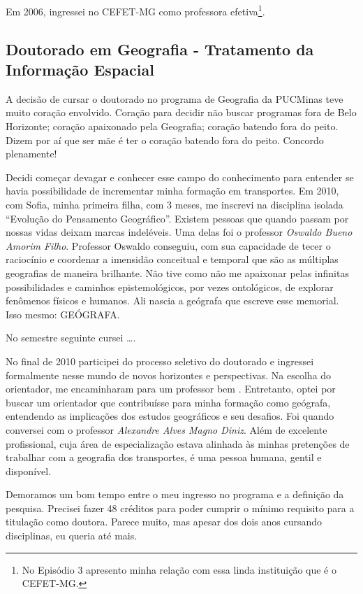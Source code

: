 \documentclass[
]{book}
\begin{document}
Em 2006, ingressei no CEFET-MG como professora efetiva\footnote{No Episódio 3 apresento minha relação com essa linda instituição que é o CEFET-MG.}.

\hypertarget{doutorado-em-geografia---tratamento-da-informauxe7uxe3o-espacial}{%
\subsection{Doutorado em Geografia - Tratamento da Informação Espacial}\label{doutorado-em-geografia---tratamento-da-informauxe7uxe3o-espacial}}

A decisão de cursar o doutorado no programa de Geografia da PUCMinas teve muito coração envolvido. Coração para decidir não buscar programas fora de Belo Horizonte; coração apaixonado pela Geografia; coração batendo fora do peito. Dizem por aí que ser mãe é ter o coração batendo fora do peito. Concordo plenamente!

Decidi começar devagar e conhecer esse campo do conhecimento para entender se havia possibilidade de incrementar minha formação em transportes. Em 2010, com Sofia, minha primeira filha, com 3 meses, me inscrevi na disciplina isolada ``Evolução do Pensamento Geográfico''. Existem pessoas que quando passam por nossas vidas deixam marcas indeléveis. Uma delas foi o professor \emph{Oswaldo Bueno Amorim Filho}. Professor Oswaldo conseguiu, com sua capacidade de tecer o raciocínio e coordenar a imensidão conceitual e temporal que são as múltiplas geografias de maneira brilhante. Não tive como não me apaixonar pelas infinitas possibilidades e caminhos epistemológicos, por vezes ontológicos, de explorar fenômenos físicos e humanos. Ali nascia a geógrafa que escreve esse memorial. Isso mesmo: GEÓGRAFA.

No semestre seguinte cursei \ldots.

No final de 2010 participei do processo seletivo do doutorado e ingressei formalmente nesse mundo de novos horizontes e perspectivas. Na escolha do orientador, me encaminharam para um professor bem . Entretanto, optei por buscar um orientador que contribuísse para minha formação como geógrafa, entendendo as implicações dos estudos geográficos e seu desafios. Foi quando conversei com o professor \emph{Alexandre Alves Magno Diniz}. Além de excelente profissional, cuja área de especialização estava alinhada às minhas pretenções de trabalhar com a geografia dos transportes, é uma pessoa humana, gentil e disponível.

Demoramos um bom tempo entre o meu ingresso no programa e a definição da pesquisa. Precisei fazer 48 créditos para poder cumprir o mínimo requisito para a titulação como doutora. Parece muito, mas apesar dos dois anos cursando disciplinas, eu queria até mais.
\end{document}
